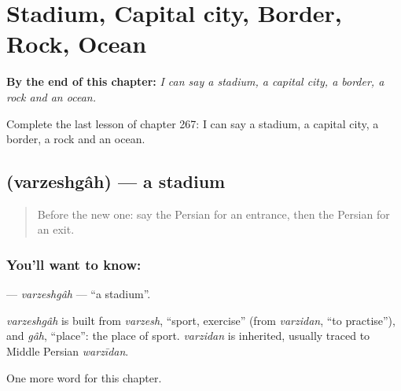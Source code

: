
\chapter{Stadium, Capital city, Border, Rock, Ocean}
\label{ch:fa-stadium-capital-city-border-rock-ocean}

\begin{chapteropening}
\textbf{By the end of this chapter:} \emph{I can say a stadium, a capital city, a border, a rock and an ocean.}

Complete the last lesson of chapter 267: I can say a stadium, a capital city, a border, a rock and an ocean.
\end{chapteropening}

\section[\texorpdfstring{\fa{ورزشگاه} (varzeshgâh)}{ورزشگاه (varzeshgâh)}]{ (varzeshgâh) — a stadium}

\label{lesson:FA-C267-varzeshgah}



\begin{quote}
Before the new one: say the Persian for an entrance, then the Persian for an exit.
\end{quote}

\subsection*{You'll want to know: }
\textbf{} — \emph{varzeshgâh} — \textquotedblleft{}a stadium\textquotedblright{}.

\begin{cousinweb}
\emph{varzeshgâh} is built from \emph{varzesh}, \textquotedblleft{}sport, exercise\textquotedblright{} (from \emph{varzidan}, \textquotedblleft{}to practise\textquotedblright{}), and \emph{gâh}, \textquotedblleft{}place\textquotedblright{}: the place of sport. \emph{varzidan} is inherited, usually traced to Middle Persian \emph{warzīdan}.
\end{cousinweb}

\begin{grammarlens}[title={What you've built}]
One more word for this chapter.
\end{grammarlens}

